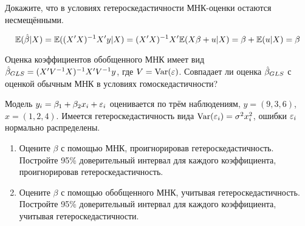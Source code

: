 \begin{problem}
Докажите, что в условиях гетероскедастичности МНК-оценки остаются несмещёнными.


\begin{sol}
\[
\mathbb{E}(\hat{\beta}|X) = \mathbb{E}((X'X)^{-1}X'y|X)=(X'X)^{-1}X'\mathbb{E}(X\beta + u|X)=\beta + \mathbb{E}(u|X)=\beta
\]
\end{sol}
\end{problem}



\begin{problem}
Оценка коэффициентов обобщенного МНК имеет вид $\hat{\beta}_{GLS}=(X'V^{-1}X)^{-1}X'V^{-1}y$, где $V=\operatorname{Var}(\varepsilon)$. Совпадает ли оценка $\hat{\beta}_{GLS}$ с оценкой обычным МНК в условиях гомоскедастичности?


\begin{sol}
\end{sol}
\end{problem}



\begin{problem}
Модель $y_i=\beta_1 + \beta_2 x_i +\varepsilon_i$ оценивается по трём наблюдениям, $y=(9,3,6)$, $x=(1,2,4)$. Имеется гетероскедастичность вида $\operatorname{Var}(\varepsilon_i)=\sigma^2 x_i^2$, ошибки $\varepsilon_i$ нормально распределены.
\begin{enumerate}
\item Оцените $\beta$ с помощью МНК, проигнорировав гетероскедастичность. Постройте 95\% доверительный интервал для каждого коэффициента, проигнорировав гетероскедастичность.
\item Оцените $\beta$ с помощью обобщенного МНК, учитывая гетероскедастичность. Постройте 95\% доверительный интервал для каждого коэффициента, учитывая гетероскедастичности.
\end{enumerate}


\begin{sol}
\end{sol}
\end{problem}



